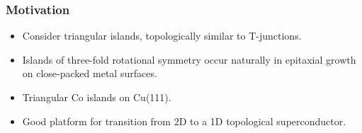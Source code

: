 \documentclass[xcolor=dvipsnames,10pt,aspectratio=169]{beamer}
\newcommand{\MO}{Motivation}
\begin{document}
  \begin{frame}
    \frametitle{\MO}
    \begin{multicols}{2}

    \begin{itemize}
      \item Consider triangular islands, topologically similar to T-junctions.
      \item Islands of three-fold rotational symmetry occur naturally in epitaxial growth on close-packed metal surfaces.
      \item Triangular Co islands on Cu(111).
      \item Good platform for transition from 2D to a 1D topological superconductor.
    \end{itemize}
    \newline

    \begin{figure}
      \end{figure}
    \end{multicols}

  \end{frame}
\end{document}

